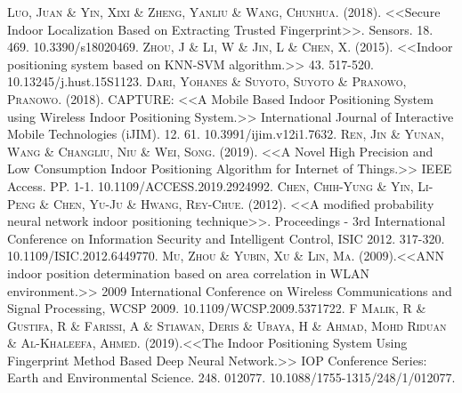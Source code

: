 \documentclass[12pt]{report}
\begin{document}
\begin{thebibliography}{X}
 \textsc{Luo, Juan \& Yin, Xixi \& Zheng, Yanliu \& Wang, Chunhua.} (2018). <<Secure Indoor Localization Based on Extracting Trusted Fingerprint>>. Sensors. 18. 469. 10.3390/s18020469.
 \textsc{Zhou, J \& Li, W \& Jin, L \& Chen, X.} (2015). <<Indoor positioning system based on KNN-SVM algorithm.>> 43. 517-520. 10.13245/j.hust.15S1123.
\textsc{Dari, Yohanes \& Suyoto, Suyoto \& Pranowo, Pranowo.} (2018). CAPTURE: <<A Mobile Based Indoor Positioning System using Wireless Indoor Positioning System.>> International Journal of Interactive Mobile Technologies (iJIM). 12. 61. 10.3991/ijim.v12i1.7632. 
 \textsc{Ren, Jin \& Yunan, Wang \& Changliu, Niu \& Wei, Song}. (2019). <<A Novel High Precision and Low Consumption Indoor Positioning Algorithm for Internet of Things.>> IEEE Access. PP. 1-1. 10.1109/ACCESS.2019.2924992.
\textsc{Chen, Chih-Yung \& Yin, Li-Peng \& Chen, Yu-Ju \& Hwang, Rey-Chue}. (2012). <<A modified probability neural network indoor positioning technique>>. Proceedings - 3rd International Conference on Information Security and Intelligent Control, ISIC 2012. 317-320. 10.1109/ISIC.2012.6449770.
 \textsc{Mu, Zhou \& Yubin, Xu \& Lin, Ma}. (2009).<<ANN indoor position determination based on area correlation in WLAN environment.>> 2009 International Conference on Wireless Communications and Signal Processing, WCSP 2009. 10.1109/WCSP.2009.5371722. 
 \textsc{F Malik, R \& Gustifa, R \& Farissi, A \& Stiawan, Deris \& Ubaya, H \& Ahmad, Mohd Riduan \& Al-Khaleefa, Ahmed. (2019)}.<<The Indoor Positioning System Using Fingerprint Method Based Deep Neural Network.>> IOP Conference Series: Earth and Environmental Science. 248. 012077. 10.1088/1755-1315/248/1/012077. 
\end{thebibliography}


	\appendix
%	
	
\end{document}
